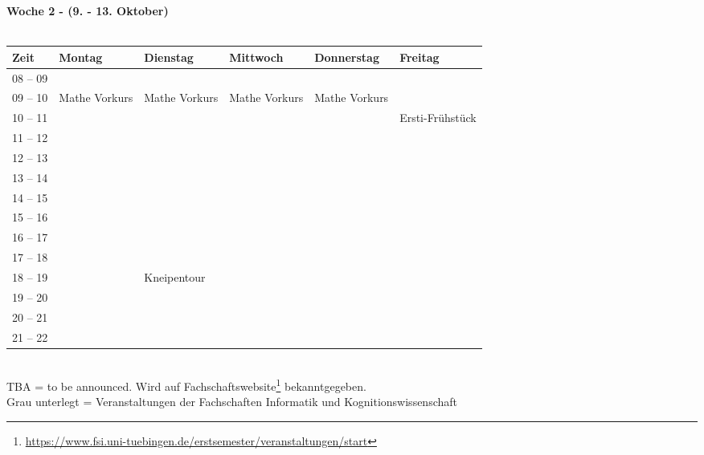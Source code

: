 \textbf{Woche 2 - (9. - 13. Oktober)}\\
\\
\begin{tabular}{|l|p{}|p{}|p{}|p{}|p{}|} \hline
 Zeit & Montag & Dienstag & Mittwoch & Donnerstag & Freitag \\ \hline \hline
 08 -- 09 & & & & & \\ \cline{1-5}
 09 -- 10 & \footnotesize{Mathe Vorkurs} & \footnotesize{Mathe Vorkurs} & \footnotesize{Mathe Vorkurs} & \footnotesize{Mathe Vorkurs} &  \\ \cline{1-1}
 10 -- 11 & & & & &\cellcolor{lightlightgray} \scriptsize{Ersti-Frühstück} \\ \cline{1-1}
 11 -- 12 & & & & & \\ \cline{1-1}
 12 -- 13 & & & & & \\ \cline{1-1}
 13 -- 14 & & & & & \\ \cline{1-1}
 14 -- 15 & & & & & \\ \cline{1-1}
 15 -- 16 & & & & & \\ \cline {1-5}
 16 -- 17 & & & & & \\ \cline{1-1}
 17 -- 18 & & & & & \\ \cline{1-1}
 18 -- 19 & &\cellcolor{lightlightgray} \footnotesize{Kneipentour} & & & \\ \cline{1-1}
 19 -- 20 & &\cellcolor{lightlightgray}  & & & \\ \cline{1-1}
 20 -- 21 & &\cellcolor{lightlightgray}  & & &  \\ \cline{1-1}
 21 -- 22 & &\cellcolor{lightlightgray}  & & & \\ \hline
\end{tabular}
\\
\scriptsize{TBA = to be announced. Wird auf Fachschaftswebsite\footnote{\url{https://www.fsi.uni-tuebingen.de/erstsemester/veranstaltungen/start}}  bekanntgegeben.} \\
\scriptsize{Grau unterlegt = Veranstaltungen der Fachschaften Informatik und Kognitionswissenschaft }
\newpage


